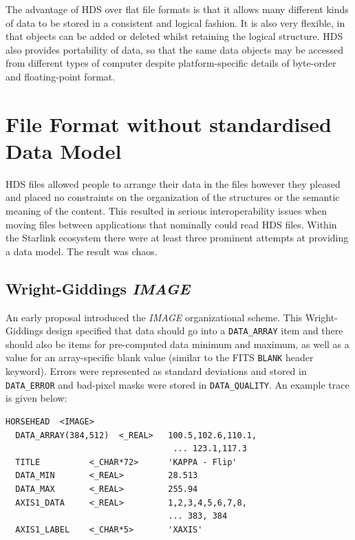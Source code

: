 \documentclass[final,authoryear,5p,times,twocolumn]{elsarticle}
\begin{document}
The advantage of HDS over flat file formats is that it allows many different kinds of data to
be stored in a consistent and logical fashion. It is also very
flexible, in that objects can be added or deleted whilst retaining the
logical structure.  HDS also provides portability of data, so that the
same data objects may be accessed from different types of computer
despite platform-specific details of byte-order and floating-point format.

\section{File Format without standardised Data Model}
\label{sec:chaos}

HDS files allowed people to arrange their data in the files however
they pleased and placed no constraints on the organization of the
structures or the semantic meaning of the content. This resulted in
serious interoperability issues when moving files between applications
that nominally could read HDS files. Within the Starlink ecosystem
there were at least three prominent attempts at providing a data model.
The result was chaos.

\subsection{Wright-Giddings \emph{IMAGE}}

An early proposal \citep[][but see also \citet{SGP38}]{WrightGiddings1983} introduced the
\emph{IMAGE} organizational scheme. This Wright-Giddings design specified that
data should go into a \texttt{DATA\_ARRAY} item and there should also be
items for pre-computed data minimum and maximum, as well as a value for
an array-specific blank value (similar to the FITS \texttt{BLANK}
header keyword). Errors were represented as standard
deviations and stored in \texttt{DATA\_ERROR} and bad-pixel masks were
stored in \texttt{DATA\_QUALITY}. An example trace is given below:

{
\small
\begin{verbatim}
HORSEHEAD  <IMAGE>
  DATA_ARRAY(384,512)  <_REAL>   100.5,102.6,110.1,
                                  ... 123.1,117.3
  TITLE          <_CHAR*72>      'KAPPA - Flip'
  DATA_MIN       <_REAL>         28.513
  DATA_MAX       <_REAL>         255.94
  AXIS1_DATA     <_REAL>         1,2,3,4,5,6,7,8,
                                 ... 383, 384
  AXIS1_LABEL    <_CHAR*5>       'XAXIS'
\end{verbatim}
}
\end{document}
